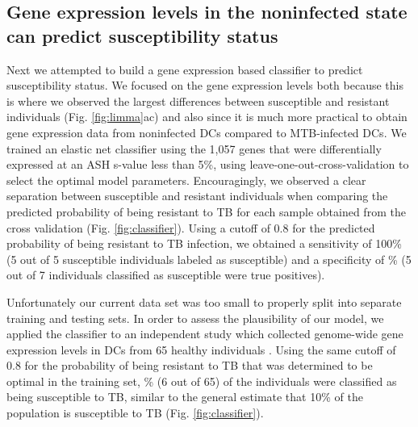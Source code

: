 \documentclass[fleqn,10pt]{wlscirep}
\begin{document}
\subsection*{Gene expression levels in the noninfected state can predict susceptibility status}

Next we attempted to build a gene expression based classifier to
predict susceptibility status. We focused on the gene expression
levels both because this is where we observed the largest differences
between susceptible and resistant individuals (Fig. \ref{fig:limma}ac)
and also since it is much more practical to obtain gene expression
data from noninfected DCs compared to MTB-infected DCs. We trained an
elastic net classifier using the 1,057 genes that were differentially
expressed at an ASH s-value \cite{Stephens2016} less than 5\%, using
leave-one-out-cross-validation to select the optimal model parameters.
Encouragingly, we observed a clear separation between susceptible and
resistant individuals when comparing the predicted probability of
being resistant to TB for each sample obtained from the cross
validation (Fig. \ref{fig:classifier}). Using a cutoff of 0.8 for the
predicted probability of being resistant to TB infection, we obtained
a sensitivity of 100\% (5 out of 5 susceptible individuals labeled as
susceptible) and a specificity of \% (5 out of 7
individuals classified as susceptible were true positives).

Unfortunately our current data set was too small to properly split
into separate training and testing sets. In order to assess the
plausibility of our model, we applied the classifier to an independent
study which collected genome-wide gene expression levels in DCs from
65 healthy individuals \cite{Barreiro2012}. Using the same cutoff of
0.8 for the probability of being resistant to TB that was determined
to be optimal in the training set, \% (6 out of 65) of
the individuals were classified as being susceptible to TB, similar to
the general estimate that 10\% of the population is susceptible to TB
(Fig. \ref{fig:classifier}).
\end{document}

